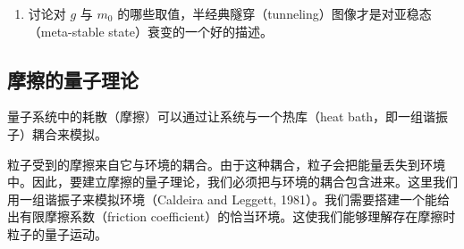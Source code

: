 
\begin{enumerate}
\item[6.] 讨论对 $g$ 与 $m_0$ 的哪些取值，半经典隧穿（tunneling）图像才是对亚稳态（meta-stable state）衰变的一个好的描述。
\end{enumerate}

\subsection{摩擦的量子理论}

\begin{keypoints}
\item 量子系统中的耗散（摩擦）可以通过让系统与一个热库（heat bath，即一组谐振子）耦合来模拟。
\end{keypoints}

粒子受到的摩擦来自它与环境的耦合。由于这种耦合，粒子会把能量丢失到环境中。因此，要建立摩擦的量子理论，我们必须把与环境的耦合包含进来。这里我们用一组谐振子来模拟环境（Caldeira and Leggett, 1981）。我们需要搭建一个能给出有限摩擦系数（friction coefficient）的恰当环境。这使我们能够理解存在摩擦时粒子的量子运动。

